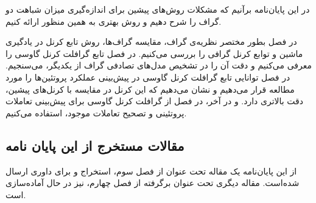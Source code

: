 در این پایان‌نامه برآنیم که مشکلات روش‌های پیشین برای اندازه‌گیری میزان شباهت دو گراف را شرح دهیم و روش بهتری به همین منظور ارائه کنیم.

در فصل  بطور مختصر نظریه‌ی گراف، مقایسه گراف‌ها، روش تابع کرنل در یادگیری ماشین و توابع کرنل گرافی را بررسی می‌کنیم. در فصل  تابع گرافلت کرنل گاوسی را معرفی می‌کنیم و دقت آن را در تشخیص مد‌ل‌های تصادفی گراف از یکدیگر، می‌سنجیم. در فصل  توانایی تابع گرافلت کرنل گاوسی در پیش‌بینی عملکرد پروتئین‌ها را مورد مطالعه قرار می‌دهیم و نشان می‌دهیم که این کرنل در مقایسه با کرنل‌های پیشین، دقت بالاتری دارد. و در آخر، در فصل  از گرافلت کرنل گاوسی برای پیش‌بینی تعاملات پروتئینی و تصحیح تعاملات موجود، استفاده می‌کنیم. 

\subsection*{
مقالات مستخرج از این پایان نامه
}
از این پایان‌نامه یک مقاله تحت عنوان 
از فصل سوم، استخراج و برای داوری ارسال شده‌است. 
مقاله دیگری تحت عنوان 
برگرفته از فصل چهارم، نیز در حال آماده‌سازی است.
